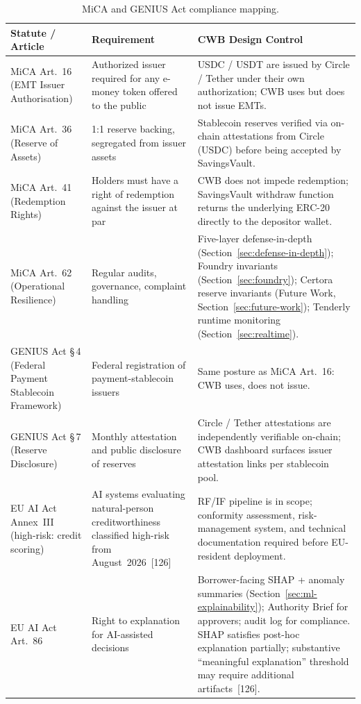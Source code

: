 \documentclass[12pt,a4paper]{report}
\newcommand{\tableheadcolor}{\rowcolor{TableHeadBg}}
\begin{document}
\begin{table}[H]
\centering
\caption[MiCA and GENIUS Act compliance mapping]{MiCA and GENIUS Act compliance mapping.}
\label{tab:mica-mapping}
\begin{tabular}{p{3.2cm}p{4.6cm}p{5.8cm}}
\toprule
\tableheadcolor
\textbf{Statute / Article} & \textbf{Requirement} & \textbf{CWB Design Control} \\
\midrule
MiCA Art.~16 (EMT Issuer Authorisation) & Authorized issuer required for any e-money token offered to the public & USDC / USDT are issued by Circle / Tether under their own authorization; CWB uses but does not issue EMTs. \\
MiCA Art.~36 (Reserve of Assets) & 1{:}1 reserve backing, segregated from issuer assets & Stablecoin reserves verified via on-chain attestations from Circle (USDC) before being accepted by SavingsVault. \\
MiCA Art.~41 (Redemption Rights) & Holders must have a right of redemption against the issuer at par & CWB does not impede redemption; SavingsVault withdraw function returns the underlying ERC-20 directly to the depositor wallet. \\
MiCA Art.~62 (Operational Resilience) & Regular audits, governance, complaint handling & Five-layer defense-in-depth (Section~\ref{sec:defense-in-depth}); Foundry invariants (Section~\ref{sec:foundry}); Certora reserve invariants (Future Work, Section~\ref{sec:future-work}); Tenderly runtime monitoring (Section~\ref{sec:realtime}). \\
GENIUS Act \S\,4 (Federal Payment Stablecoin Framework) & Federal registration of payment-stablecoin issuers & Same posture as MiCA Art.~16: CWB uses, does not issue. \\
GENIUS Act \S\,7 (Reserve Disclosure) & Monthly attestation and public disclosure of reserves & Circle / Tether attestations are independently verifiable on-chain; CWB dashboard surfaces issuer attestation links per stablecoin pool. \\
EU AI Act Annex~III (high-risk: credit scoring) & AI systems evaluating natural-person creditworthiness classified high-risk from August~2026~[126] & RF/IF pipeline is in scope; conformity assessment, risk-management system, and technical documentation required before EU-resident deployment. \\
EU AI Act Art.~86 & Right to explanation for AI-assisted decisions & Borrower-facing SHAP + anomaly summaries (Section~\ref{sec:ml-explainability}); Authority Brief for approvers; audit log for compliance. SHAP satisfies post-hoc explanation partially; substantive ``meaningful explanation'' threshold may require additional artifacts~[126]. \\

\end{tabular}
\end{table}
\end{document}
